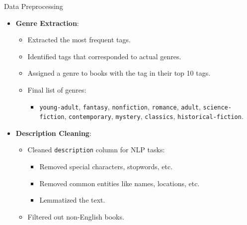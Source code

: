 \documentclass{beamer}
\begin{document}
\begin{frame}{Data Preprocessing}
    \begin{itemize}
        \item \textbf{Genre Extraction}:
            \begin{itemize}
                \item Extracted the most frequent tags.
                \item Identified tags that corresponded to actual genres.
                \item Assigned a genre to books with the tag in their top 10 tags.
                \item Final list of genres:
                    \begin{itemize}
                        \item \texttt{young-adult}, \texttt{fantasy}, \texttt{nonfiction}, \texttt{romance},
                              \texttt{adult}, \texttt{science-fiction}, \texttt{contemporary},
                              \texttt{mystery}, \texttt{classics}, \texttt{historical-fiction}.
                    \end{itemize}
            \end{itemize}
        \item \textbf{Description Cleaning}:
            \begin{itemize}
                \item Cleaned \texttt{description} column for NLP tasks:
                    \begin{itemize}
                        \item Removed special characters, stopwords, etc.
                        \item Removed common entities like names, locations, etc.
                        \item Lemmatized the text.
                    \end{itemize}
                \item Filtered out non-English books.
            \end{itemize}
    \end{itemize}
\end{frame}
\end{document}
